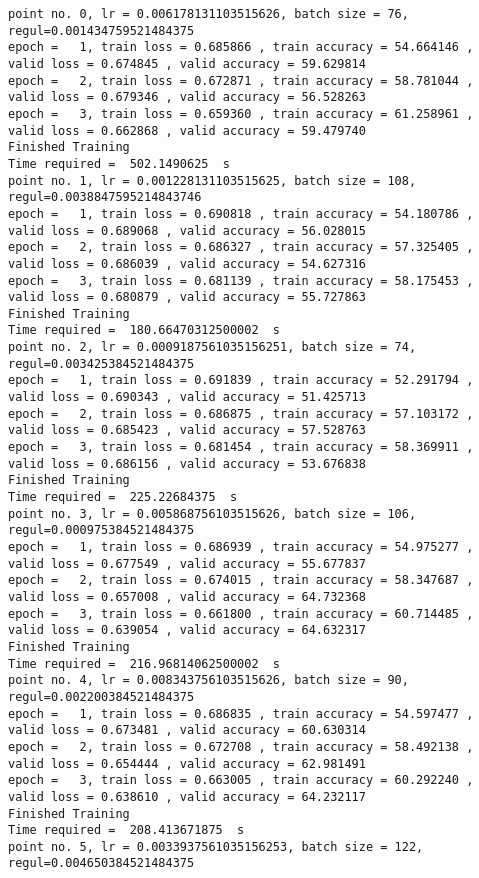 \documentclass[11pt]{article}
\begin{document}
    \begin{Verbatim}[commandchars=\\\{\}]
point no. 0, lr = 0.006178131103515626, batch size = 76, regul=0.001434759521484375
epoch =   1, train loss = 0.685866 , train accuracy = 54.664146 , valid loss = 0.674845 , valid accuracy = 59.629814
epoch =   2, train loss = 0.672871 , train accuracy = 58.781044 , valid loss = 0.679346 , valid accuracy = 56.528263
epoch =   3, train loss = 0.659360 , train accuracy = 61.258961 , valid loss = 0.662868 , valid accuracy = 59.479740
Finished Training
Time required =  502.1490625  s 
point no. 1, lr = 0.001228131103515625, batch size = 108, regul=0.0038847595214843746
epoch =   1, train loss = 0.690818 , train accuracy = 54.180786 , valid loss = 0.689068 , valid accuracy = 56.028015
epoch =   2, train loss = 0.686327 , train accuracy = 57.325405 , valid loss = 0.686039 , valid accuracy = 54.627316
epoch =   3, train loss = 0.681139 , train accuracy = 58.175453 , valid loss = 0.680879 , valid accuracy = 55.727863
Finished Training
Time required =  180.66470312500002  s 
point no. 2, lr = 0.0009187561035156251, batch size = 74, regul=0.003425384521484375
epoch =   1, train loss = 0.691839 , train accuracy = 52.291794 , valid loss = 0.690343 , valid accuracy = 51.425713
epoch =   2, train loss = 0.686875 , train accuracy = 57.103172 , valid loss = 0.685423 , valid accuracy = 57.528763
epoch =   3, train loss = 0.681454 , train accuracy = 58.369911 , valid loss = 0.686156 , valid accuracy = 53.676838
Finished Training
Time required =  225.22684375  s 
point no. 3, lr = 0.005868756103515626, batch size = 106, regul=0.000975384521484375
epoch =   1, train loss = 0.686939 , train accuracy = 54.975277 , valid loss = 0.677549 , valid accuracy = 55.677837
epoch =   2, train loss = 0.674015 , train accuracy = 58.347687 , valid loss = 0.657008 , valid accuracy = 64.732368
epoch =   3, train loss = 0.661800 , train accuracy = 60.714485 , valid loss = 0.639054 , valid accuracy = 64.632317
Finished Training
Time required =  216.96814062500002  s 
point no. 4, lr = 0.008343756103515626, batch size = 90, regul=0.002200384521484375
epoch =   1, train loss = 0.686835 , train accuracy = 54.597477 , valid loss = 0.673481 , valid accuracy = 60.630314
epoch =   2, train loss = 0.672708 , train accuracy = 58.492138 , valid loss = 0.654444 , valid accuracy = 62.981491
epoch =   3, train loss = 0.663005 , train accuracy = 60.292240 , valid loss = 0.638610 , valid accuracy = 64.232117
Finished Training
Time required =  208.413671875  s 
point no. 5, lr = 0.0033937561035156253, batch size = 122, regul=0.004650384521484375

\end{Verbatim}
\end{document}
